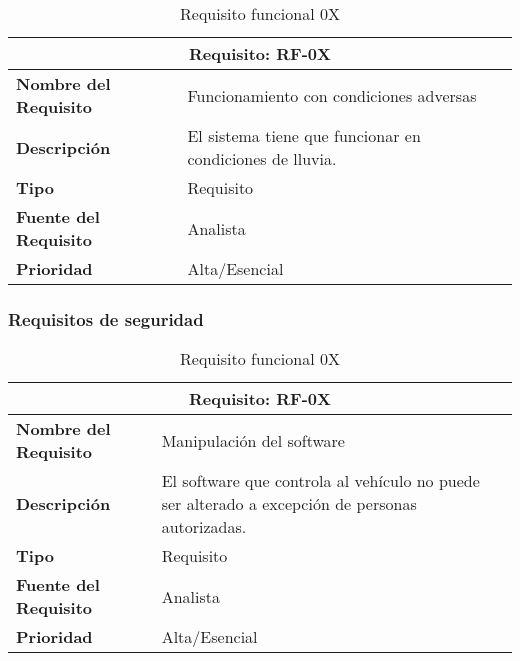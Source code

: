 \begin{table}[H]
\begin{center}
\begin{tabular}{p{} p{7cm}}
\multicolumn{2}{c}{\textbf{Requisito: RF-0X} } \\
\hline \hline
\textbf{Nombre del Requisito} & Funcionamiento con condiciones adversas\\
\hline
\textbf{Descripción} & El sistema tiene que funcionar en condiciones de lluvia.\\
\hline
\textbf{Tipo} & Requisito  \\
\hline
\textbf{Fuente del Requisito} & Analista  \\
\hline
\textbf{Prioridad} & Alta/Esencial \\ \hline
\end{tabular}
\caption{Requisito funcional 0X}
\label{tab:personal}
\end{center}
\end{table}


\subsubsection{Requisitos de seguridad}

\begin{table}[H]
\begin{center}
\begin{tabular}{p{} p{7cm}}
\multicolumn{2}{c}{\textbf{Requisito: RF-0X} } \\
\hline \hline
\textbf{Nombre del Requisito} & Manipulación del software\\
\hline
\textbf{Descripción} & El software que controla al vehículo no puede ser alterado a excepción de personas autorizadas.\\
\hline
\textbf{Tipo} & Requisito  \\
\hline
\textbf{Fuente del Requisito} & Analista  \\
\hline
\textbf{Prioridad} & Alta/Esencial \\ \hline
\end{tabular}
\caption{Requisito funcional 0X}
\label{tab:personal}
\end{center}
\end{table}

